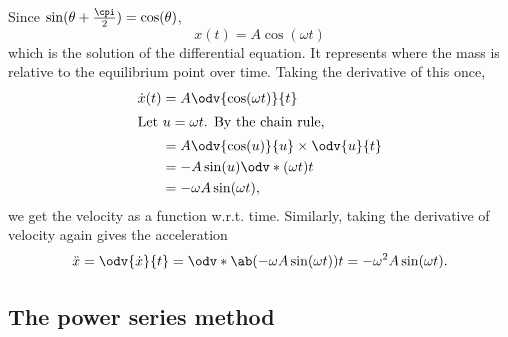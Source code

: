 Since $\sin(\theta + \frac{\cpi}{2}) = \cos(\theta)$,
\begin{equation}
	x(t) = A\cos(\omega t) \label{eq:harmonic-oscillator-solution}
\end{equation}
which is the solution of the differential equation. It represents where the mass is relative to the equilibrium point over time. Taking the derivative of this once,
\begin{align}
	\dot{x}(t) & = A\odv{\cos(\omega t)}{t}                                         \\
	\intertext{Let $u = \omega t$. By the chain rule,}
	           & = A\odv{\cos(u)}{u} \times \odv{u}{t}                              \\
	           & = -A\sin(u) \odv*{(\omega t)}{t}                                   \\
	           & = -\omega A\sin(\omega t), \label{eq:harmonic-oscillator-velocity}
\end{align}
we get the velocity as a function w.r.t. time. Similarly, taking the derivative of velocity again gives the acceleration
\begin{equation}
	\ddot{x} = \odv{\dot{x}}{t} = \odv*{\ab(-\omega A\sin(\omega t))}{t} = -\omega^2A\sin(\omega t). \label{eq:harmonic-oscillator-acceleration}
\end{equation}

\subsection{The power series method}

